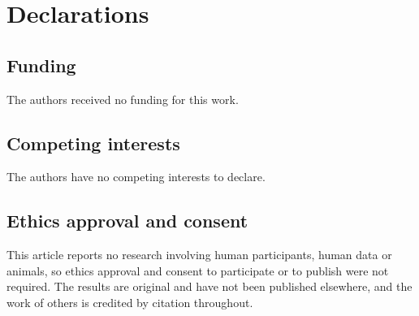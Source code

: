 \newcommand{\zenodoCodeID}{10.5281/zenodo.23227940}
\newcommand{\zenodoCodeDOI}{%
  \href{https://doi.org/\zenodoCodeID}{\texttt{\zenodoCodeID}}}

\section*{Declarations}

\subsection*{Funding}
The authors received no funding for this work.

\subsection*{Competing interests}
The authors have no competing interests to declare.

\subsection*{Ethics approval and consent}
This article reports no research involving human participants, human data or
animals, so ethics approval and consent to participate or to publish were not
required. The results are original and have not been published elsewhere,
and the work of others is credited by citation throughout.

